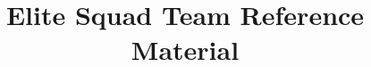 \documentclass[10pt]{article}
\title{\vspace{-4ex}\Large{Elite Squad Team Reference Material}}
\author{}
\date{}
\begin{document}
\begin{landscape}
  \begin{multicols}{2}

    \maketitle
    \vspace{-13ex}
    \tableofcontents
    \pagestyle{fancy}
    

  \end{multicols}
\end{landscape}
\end{document}
